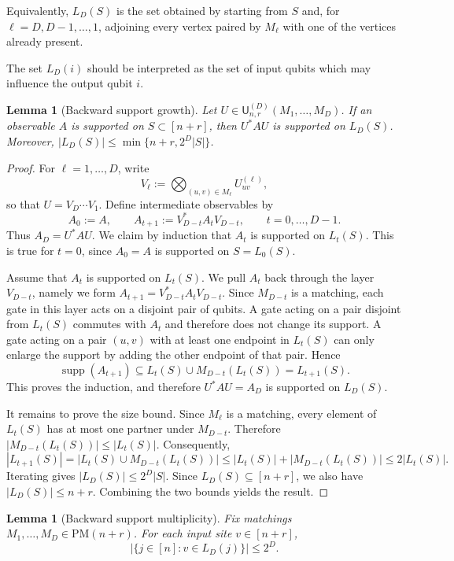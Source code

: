 \documentclass[12pt]{article}
\newtheorem{lemma}[theorem]{Lemma}
\begin{document}
Equivalently, \(L_D(S)\) is the set obtained by starting from \(S\) and, for
\(\ell=D,D-1,\dots,1\), adjoining every vertex paired by \(M_\ell\) with one of
the vertices already present. 

The set \(L_D(i)\) should be interpreted as the set of input qubits which may
influence the output qubit \(i\). 

\begin{lemma}[Backward support growth]
\label{lem:backward-support-growth}
Let $U \in \mathsf{U}^{(D)}_{n,r}(M_1,\dots, M_D)$. If an observable \(A\) is supported on \(S\subset[n+r]\), then \(U^*AU\) is
supported on \(L_D(S)\). Moreover, $|L_D(S)|\le \min\{n+r,2^D|S|\}$.
\end{lemma}

\begin{proof}
For \(\ell=1,\dots,D\), write
\[
V_\ell := \bigotimes_{(u,v)\in M_\ell} U_{uv}^{(\ell)},
\]
so that $U=V_D\cdots V_1$. Define intermediate observables by
\[
A_0:=A,
\qquad
A_{t+1}:=V_{D-t}^* A_t V_{D-t},
\qquad t=0,\dots,D-1.
\]
Thus \(A_D=U^*AU\). We claim by induction that \(A_t\) is supported on \(L_t(S)\). This is true for
\(t=0\), since \(A_0=A\) is supported on \(S=L_0(S)\).

Assume that \(A_t\) is supported on \(L_t(S)\). We pull \(A_t\) back
through the layer \(V_{D-t}\), namely we form $A_{t+1}=V_{D-t}^*A_tV_{D-t}$. Since \(M_{D-t}\) is a matching, each gate in this layer acts
on a disjoint pair of qubits. A gate acting on a pair disjoint from \(L_t(S)\)
commutes with \(A_t\) and therefore does not change its support. A gate acting
on a pair \((u,v)\) with at least one endpoint in \(L_t(S)\) can only enlarge
the support by adding the other endpoint of that pair. Hence
\[
\operatorname{supp}(A_{t+1})
\subseteq
L_t(S)\cup M_{D-t}(L_t(S))
=
L_{t+1}(S).
\]
This proves the induction, and therefore \(U^*AU=A_D\) is supported on
\(L_D(S)\).

It remains to prove the size bound. Since \(M_\ell\) is a matching, every
element of \(L_t(S)\) has at most one partner under \(M_{D-t}\). Therefore $|M_{D-t}(L_t(S))|\le |L_t(S)|$. Consequently,
\[
|L_{t+1}(S)|
=
|L_t(S)\cup M_{D-t}(L_t(S))|
\le
|L_t(S)|+|M_{D-t}(L_t(S))|
\le
2|L_t(S)|.
\]
Iterating gives $|L_D(S)|\le 2^D |S|$. Since \(L_D(S)\subseteq[n+r]\), we also have \(|L_D(S)|\le n+r\). Combining the two
bounds yields the result.
\end{proof}

\begin{lemma}[Backward support multiplicity]
\label{lem:backward-support-multiplicity}
Fix matchings \(M_1,\dots,M_D \in \mathrm{PM}(n+r)\). For each input site \(v\in[n+r]\),
\[
|\{j\in[n]:v\in L_D(j)\} |
\le 2^D.
\]
\end{lemma}
\end{document}
